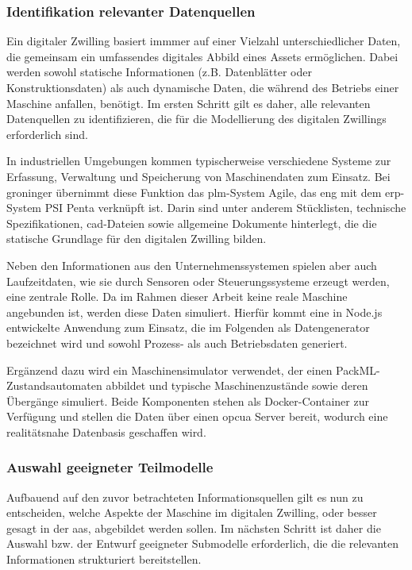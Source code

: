 \subsubsection{Identifikation relevanter Datenquellen}
Ein digitaler Zwilling basiert immmer auf einer Vielzahl unterschiedlicher Daten, die gemeinsam ein umfassendes digitales Abbild eines Assets ermöglichen. 
Dabei werden sowohl statische Informationen (z.B. Datenblätter oder Konstruktionsdaten) als auch dynamische Daten, die während des Betriebs einer Maschine anfallen, benötigt.
Im ersten Schritt gilt es daher, alle relevanten Datenquellen zu identifizieren, die für die Modellierung des digitalen Zwillings erforderlich sind.

In industriellen Umgebungen kommen typischerweise verschiedene Systeme zur Erfassung, Verwaltung und Speicherung von Maschinendaten zum Einsatz.
Bei groninger übernimmt diese Funktion das \acs{plm}-System Agile, das eng mit dem \acs{erp}-System PSI Penta verknüpft ist.
Darin sind unter anderem Stücklisten, technische Spezifikationen, \acs{cad}-Dateien sowie allgemeine Dokumente hinterlegt, die die statische Grundlage  für den digitalen Zwilling bilden.

Neben den Informationen aus den Unternehmenssystemen spielen aber auch Laufzeitdaten, wie sie durch Sensoren oder Steuerungssysteme erzeugt werden, eine zentrale Rolle.
Da im Rahmen dieser Arbeit keine reale Maschine angebunden ist, werden diese Daten simuliert.
Hierfür kommt eine in Node.js entwickelte Anwendung zum Einsatz, die im Folgenden als Datengenerator bezeichnet wird und sowohl Prozess- als auch Betriebsdaten generiert. 

Ergänzend dazu wird ein Maschinensimulator verwendet, der einen PackML-Zustands\-automaten abbildet und typische Maschinenzustände sowie deren Übergänge simuliert. 
Beide Komponenten stehen als Docker-Container zur Verfügung und stellen die Daten über einen \acs{opcua} Server bereit, wodurch eine realitätsnahe Datenbasis geschaffen wird.
\subsubsection{Auswahl geeigneter Teilmodelle}
Aufbauend auf den zuvor betrachteten Informationsquellen gilt es nun zu entscheiden, welche Aspekte der Maschine im digitalen Zwilling, oder besser gesagt in der \acs{aas}, abgebildet werden sollen.
Im nächsten Schritt ist daher die Auswahl bzw. der Entwurf geeigneter Submodelle erforderlich, die die relevanten Informationen strukturiert bereitstellen.

